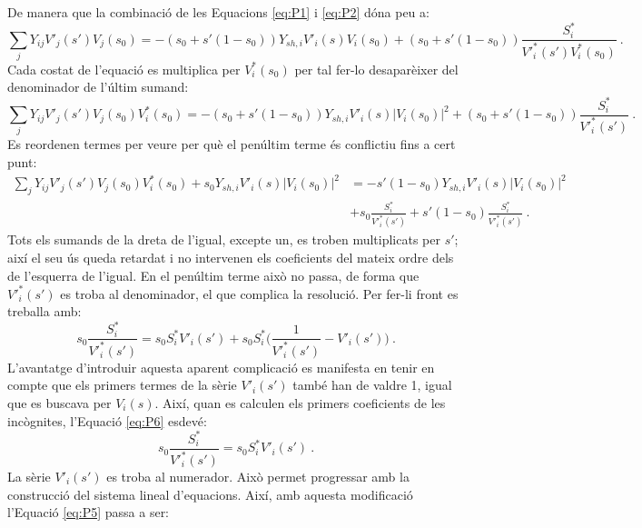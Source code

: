 De manera que la combinació de les Equacions \ref{eq:P1} i \ref{eq:P2} dóna peu a:
\begin{equation}
    \sum_{j}Y_{ij}V'_j(s')V_j(s_0)=-(s_0+s'(1-s_0))Y_{sh,i}V'_i(s)V_i(s_0)+(s_0+s'(1-s_0))\frac{S^*_i}{V'^{*}_i(s')V^*_i(s_0)}\ .
        \label{eq:P3}
\end{equation}
Cada costat de l'equació es multiplica per $V^*_i(s_0)$ per tal fer-lo desaparèixer del denominador de l'últim sumand:
\begin{equation}
    \sum_{j}Y_{ij}V'_j(s')V_j(s_0)V^*_i(s_0)=-(s_0+s'(1-s_0))Y_{sh,i}V'_i(s)|V_i(s_0)|^2+(s_0+s'(1-s_0))\frac{S^*_i}{V'^{*}_i(s')}\ .
        \label{eq:P4}
\end{equation}
Es reordenen termes per veure per què el penúltim terme és conflictiu fins a cert punt:
\begin{equation}
    \begin{split}
    \sum_{j}Y_{ij}V'_j(s')V_j(s_0)V^*_i(s_0)+s_0Y_{sh,i}V'_i(s)|V_i(s_0)|^2&=-s'(1-s_0)Y_{sh,i}V'_i(s)|V_i(s_0)|^2\\
    &+s_0\frac{S^*_i}{V'^{*}_i(s')}+s'(1-s_0)\frac{S^*_i}{V'^{*}_i(s')}\ .
    \end{split}
        \label{eq:P5}
\end{equation}
Tots els sumands de la dreta de l'igual, excepte un, es troben multiplicats per $s'$; així el seu ús queda retardat i no intervenen els coeficients del mateix ordre dels de l'esquerra de l'igual. En el penúltim terme això no passa, de forma que $V'^{*}_i(s')$ es troba al denominador, el que complica la resolució. Per fer-li front es treballa amb:
\begin{equation}
    s_0\frac{S^*_i}{V'^{*}_i(s')} = s_0S^*_iV'_i(s')+s_0S^*_i\biggl(\frac{1}{V'^{*}_i(s')}-V'_i(s')\biggr)\ .
        \label{eq:P6}
\end{equation}
L'avantatge d'introduir aquesta aparent complicació es manifesta en tenir en compte que els primers termes de la sèrie $V'_i(s')$ també han de valdre 1, igual que es buscava per $V_i(s)$. Així, quan es calculen els primers coeficients de les incògnites, l'Equació \ref{eq:P6} esdevé:
\begin{equation}
    s_0\frac{S^*_i}{V'^{*}_i(s')} = s_0S^*_iV'_i(s')\ .
        \label{eq:P6x}
\end{equation}
La sèrie $V'_i(s')$ es troba al numerador. Això permet progressar amb la construcció del sistema lineal d'equacions. Així, amb aquesta modificació l'Equació \ref{eq:P5} passa a ser:
